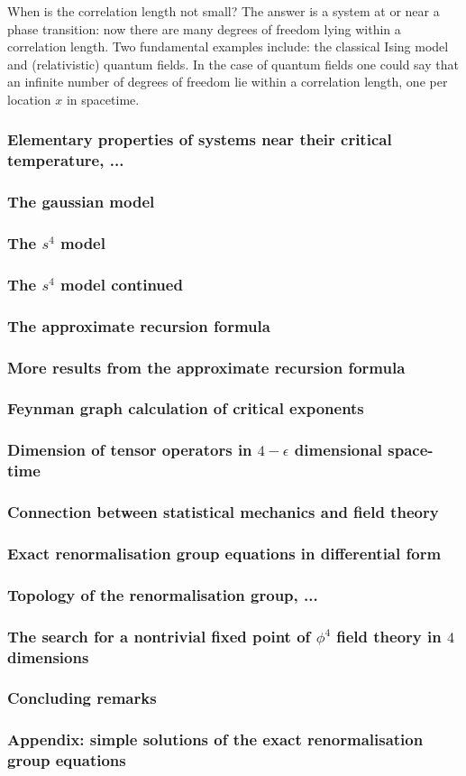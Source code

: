 \documentclass[11pt]{amsart}
\theoremstyle{plain}%
\theoremstyle{definition}
\theoremstyle{remark}
\begin{document}
When is the correlation length not small? The answer is a system at or near a phase transition: now there are many degrees of freedom lying within a correlation length. Two fundamental examples include: the classical Ising model and (relativistic) quantum fields. In the case of quantum fields one could say that an infinite number of degrees of freedom lie within a correlation length, one per location $x$ in spacetime.


\subsubsection{Elementary properties of systems near their critical temperature, ...}
\subsubsection{The gaussian model}
\subsubsection{The $s^4$ model}
\subsubsection{The $s^4$ model continued}
\subsubsection{The approximate recursion formula}
\subsubsection{More results from the approximate recursion formula}
\subsubsection{Feynman graph calculation of critical exponents}
\subsubsection{Dimension of tensor operators in $4-\epsilon$ dimensional space-time}
\subsubsection{Connection between statistical mechanics and field theory}
\subsubsection{Exact renormalisation group equations in differential form}
\subsubsection{Topology of the renormalisation group, ...}
\subsubsection{The search for a nontrivial fixed point of $\phi^4$ field theory in $4$ dimensions}
\subsubsection{Concluding remarks}
\subsubsection{Appendix: simple solutions of the exact renormalisation group equations}
\end{document}
